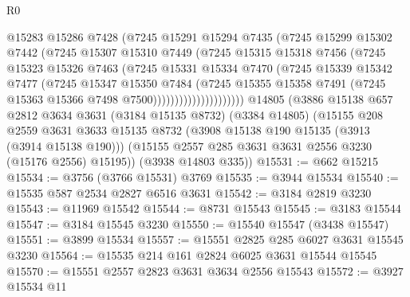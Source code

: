 \begin{lexlean}{R0}
\begin{coremodule}
                          @15283
                          @15286
                          @7428
                          (@7245
                            @15291
                            @15294
                            @7435
                            (@7245
                              @15299
                              @15302
                              @7442
                              (@7245
                                @15307
                                @15310
                                @7449
                                (@7245
                                  @15315
                                  @15318
                                  @7456
                                  (@7245
                                    @15323
                                    @15326
                                    @7463
                                    (@7245
                                      @15331
                                      @15334
                                      @7470
                                      (@7245
                                        @15339
                                        @15342
                                        @7477
                                        (@7245
                                          @15347
                                          @15350
                                          @7484
                                          (@7245
                                            @15355
                                            @15358
                                            @7491
                                            (@7245 @15363 @15366 @7498 @7500)))))))))))))))))))))
    @14805
    (@3886
      @15138
      @657
      @2812
      @3634
      @3631
      (@3184 @15135 @8732)
      (@3384 @14805)
      (@15155
        @208
        @2559
        @3631
        @3633
        @15135
        @8732
        (@3908 @15138 @190 @15135 (@3913 (@3914 @15138 @190)))
        (@15155 @2557 @285 @3631 @3631 @2556 @3230 (@15176 @2556) @15195))
      (@3938 @14803 @335))
@15531 := @662 @15215
@15534 := @3756 (@3766 @15531) @3769
@15535 := @3944 @15534
@15540 := @15535 @587 @2534 @2827 @6516 @3631
@15542 := @3184 @2819 @3230
@15543 := @11969 @15542
@15544 := @8731 @15543
@15545 := @3183 @15544
@15547 := @3184 @15545 @3230
@15550 := @15540 @15547 (@3438 @15547)
@15551 := @3899 @15534
@15557 := @15551 @2825 @285 @6027 @3631 @15545 @3230
@15564 := @15535 @214 @161 @2824 @6025 @3631 @15544 @15545
@15570 := @15551 @2557 @2823 @3631 @3634 @2556 @15543
@15572 := @3927 @15534 @11

\end{coremodule}
\end{lexlean}
